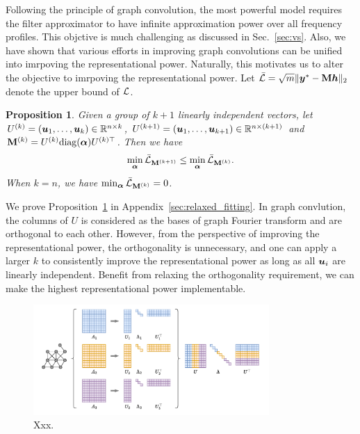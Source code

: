 \documentclass{article} %
\def\valpha{{\bm\alpha}}
\newtheorem{proposition}{\textbf{Proposition}} %
\begin{document}
Following the principle of graph convolution, the most powerful model requires the filter approximator to have infinite approximation power over all frequency profiles.
This objctive is much challenging as discussed in Sec.~\ref{sec:vs}.
Also, we have shown that various efforts in improving graph convolutions can be unified into imrpoving the representational power.
Naturally, this motivates us to alter the objective to imrpoving the representational power.
Let $\bar{{\mathcal{L}}}=\sqrt{m}\|{\bm{y}}^*-{\mathbf{M}}{\bm{h}}\|_2$ denote the upper bound of ${\mathcal{L}}$.
\begin{proposition}
	\label{prop:relaxed_fitting}
	Given a group of $k+1$ linearly independent vectors, let $U^{(k)}=({\bm{u}}_1,\dots,{\bm{u}}_k)\in{\mathbb{R}}^{n\times k}$, $U^{(k+1)}=({\bm{u}}_1,\dots,{\bm{u}}_{k+1})\in{\mathbb{R}}^{n\times(k+1)}$ and $\rmM^{(k)}=U^{(k)}\mathrm{diag}(\valpha)U^{(k)\top}$.
	Then we have
	\begin{equation}
		\begin{aligned}
			\min_{\valpha}\bar\gL_{\rmM^{(k+1)}}\leq\min_{\valpha}\bar\gL_{\rmM^{(k)}}.
		\end{aligned}
	\end{equation}
	When $k=n$, we have $\min_{\valpha}\bar\gL_{\rmM^{(k)}}=0$.
\end{proposition}
We prove Proposition~\ref{prop:relaxed_fitting} in Appendix~\ref{sec:relaxed_fitting}.
In graph convlution, the columns of $U$ is considered as the bases of graph Fourier transform and are orthogonal to each other.
However, from the perspective of improving the representational power, the orthogonality is unnecessary, and one can apply a larger $k$ to consistently improve the representational power as long as all ${\bm{u}}_i$ are linearly independent.
Benefit from relaxing the orthogonality requirement, we can make the highest representational power implementable.

\begin{figure}[h]
	\centering
	\includegraphics[width=0.8\textwidth]{figure/mte}
	\caption{Xxx.}
	\label{fig:mte}
\end{figure}
\end{document}
